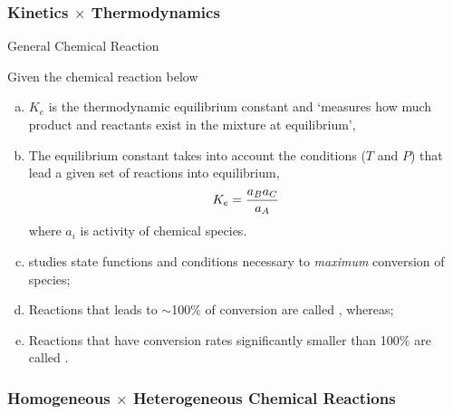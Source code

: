 \documentclass[10pt,compress,handout,unknownkeysallowed]{beamer}
\begin{document}
\begin{frame}
  \frametitle{Kinetics $\times$ Thermodynamics}

  \begin{block}{\begin{center}General Chemical Reaction\end{center}}
     Given the chemical reaction below
  \end{block}  

   \begin{enumerate}[a)]
       \item<1-> $K_{e}$ is the thermodynamic equilibrium constant and `measures how much product and reactants exist in the mixture at equilibrium',
       \item<1-> The equilibrium constant takes into account the conditions ($T$ and $P$) that lead a given set of reactions into equilibrium, \eg
             \begin{displaymath}
                  K_{e} = \displaystyle\frac{a_{B}a_{C}}{a_{A}}
             \end{displaymath}
             where $a_{i}$ is activity of  chemical species. 
       \item<1->  studies state functions and conditions necessary to {\it maximum} conversion of species;
       \item<1-> Reactions that leads to $\sim$100$\%$ of conversion are called , whereas;
       \item<1-> Reactions that have conversion rates significantly smaller than 100$\%$ are called .
   \end{enumerate}
\end{frame}
\normalsize

\begin{frame}
  \frametitle{Homogeneous $\times$ Heterogeneous Chemical Reactions}

\end{frame}
\normalsize
\end{document}
